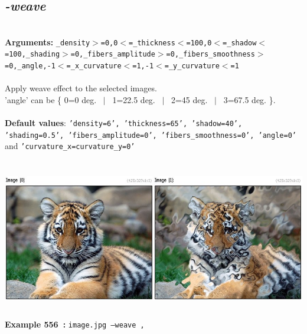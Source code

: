 \documentclass[a4paper,11pt,twoside]{book}
\begin{document}
\subsection{\emph{-weave} }\vspace*{-0.5em}
~\\\textbf{Arguments: } 
{\small \texttt{\_density$>$=0,0$<$=\_thickness$<$=100,0$<$=\_shadow$<$=100,\_shading$>$=0,\_fibers\_amplitude$>$=0,\_fibers\_smoothness$>$=0,\_angle,-1$<$=\_x\_curvature$<$=1,-1$<$=\_y\_curvature$<$=1}}\\~\\
Apply weave effect to the selected images.
~\\'angle' can be \{ 0=0 deg. ~$|$~ 1=22.5 deg. ~$|$~ 2=45 deg. ~$|$~ 3=67.5 deg. \}.
~\\~\\\textbf{Default values}: {\small \texttt{'density=6', 'thickness=65', 'shadow=40', 'shading=0.5', 'fibers\_amplitude=0', 'fibers\_smoothness=0', 'angle=0'} and \texttt{'curvature\_x=curvature\_y=0'}}
\begin{center}\includegraphics[keepaspectratio=true,height=7cm,width=\textwidth]{img/gmic_def556.jpg}\\
{\footnotesize \textbf{Example 556~:} \texttt{image.jpg --weave ,}}
\end{center}
\end{document}
